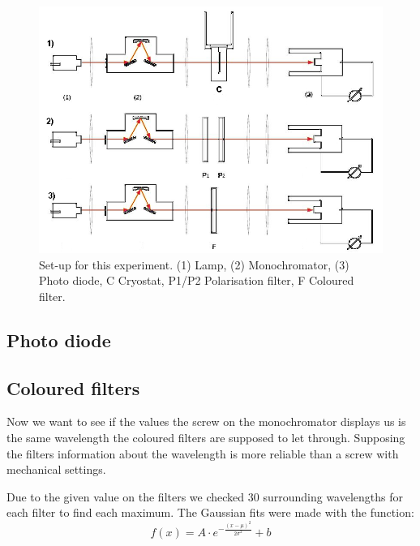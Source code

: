 \documentclass[]{article}
\begin{document}
\begin{figure}[H]
\centering
\includegraphics[width=.9\textwidth]{Plots/setup.png}
\caption{Set-up for this experiment. (1) Lamp, (2) Monochromator, (3) Photo diode, C Cryostat, P1/P2 Polarisation filter, F Coloured filter. }
\label{fig:setup}
\end{figure}

\subsection{Photo diode}
\subsection{Coloured filters} \label{color filters}
Now we want to see if the values the screw on the monochromator displays us is the same wavelength the coloured filters are supposed to let through. Supposing the filters information about the wavelength is more reliable than a screw with mechanical settings.

Due to the given value on the filters we checked 30 surrounding wavelengths for each filter to find each maximum. The Gaussian fits were made with the function:
\begin{equation}
f(x) = A \cdot e^{-\frac{(x-\mu)^2}{2 \sigma^2}} + b
\end{equation}
\end{document}
